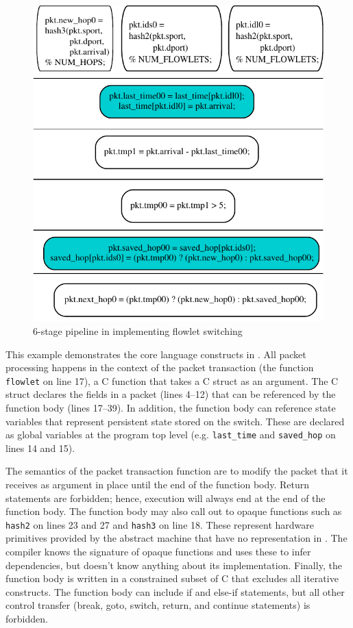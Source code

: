 \begin{figure}[!t]
  \includegraphics[width=\columnwidth]{pipe.pdf}
  \caption{6-stage pipeline in \absmachine implementing flowlet switching}
  \label{fig:pipeline}
\end{figure}

This example demonstrates the core language constructs in \pktlanguage. All
packet processing happens in the context of the packet transaction (the
function \texttt{flowlet} on line 17), a C function that takes a C struct as an
argument. The C struct declares the fields in a packet (lines 4--12) that can
be referenced by the function body (lines 17--39).  In addition, the function
body can reference state variables that represent persistent state stored on
the switch. These are declared as global variables at the program top level
(e.g. \texttt{last\_time} and \texttt{saved\_hop} on lines 14 and 15).

The semantics of the packet transaction function are to modify the packet that
it receives as argument in place until the end of the function body. Return
statements are forbidden; hence, execution will always end at the end of
the function body. The function body may also call out to opaque functions such
as \texttt{hash2} on lines 23 and 27 and \texttt{hash3} on line 18. These
represent hardware primitives provided by the abstract machine that have no
representation in \pktlanguage. The \pktlanguage compiler knows the signature
of opaque functions and uses these to infer dependencies, but doesn't know
anything about its implementation. Finally, the function body is written in a
constrained subset of C that excludes all iterative constructs. The function
body can include if and else-if statements, but all other control transfer
(break, goto, switch, return, and continue statements) is forbidden.


